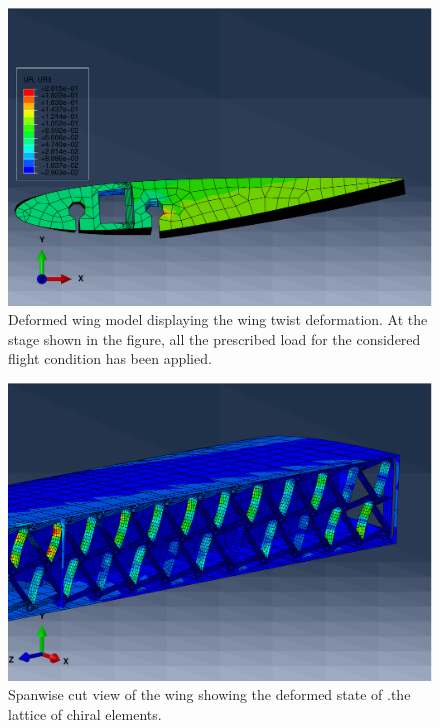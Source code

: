       \begin{figure}[!htpb]
        \centering
        \includegraphics[width=0.8 \textwidth]{figures/wing-model/bucklingWing3}
        \caption[Deformed wing model displaying the wing twist deformation]{Deformed wing model displaying the wing twist deformation. At the stage shown in the figure, all the prescribed load for the considered flight condition has been applied.}
        \label{fig:bucklingWing3}
      \end{figure}

      \begin{figure}[!htpb]
        \centering
        \includegraphics[width=0.8 \textwidth]{figures/wing-model/bucklingWing2}
        \caption[Spanwise cut view of the wing showing the deformed state of the lattice of chiral elements]{Spanwise cut view of the wing showing the deformed state of .the lattice of chiral elements.}
        \label{fig:bucklingWing2}
      \end{figure}
